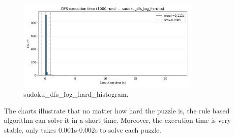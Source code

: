 \begin{figure}[H]
\centering
\includegraphics[width=0.8\textwidth]{resources/sudoku_dfs_log_hard_histogram.png}
\caption{sudoku\_dfs\_log\_hard\_histogram.}
\label{fig:sudoku_dfs_log_hard_histogram}
\end{figure}

The charts illustrate that no matter how hard the puzzle is, the rule based algorithm can solve it in a short time. Moreover, the execution time is very stable, only takes 0.001s-0.002s to solve each puzzle.
